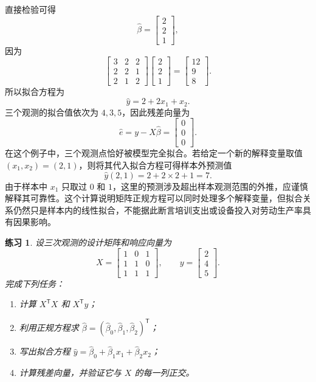 \documentclass[UTF8,fontset=fandol,11pt]{ctexart}
\newtheorem{exercise}[definition]{练习}
\begin{document}
直接检验可得
\[
\hat\beta=
\begin{bmatrix}2\\2\\1\end{bmatrix},
\]
因为
\[
\begin{bmatrix}3&2&2\\2&2&1\\2&1&2\end{bmatrix}
\begin{bmatrix}2\\2\\1\end{bmatrix}
=
\begin{bmatrix}12\\9\\8\end{bmatrix}.
\]
所以拟合方程为
\[
\hat y=2+2x_1+x_2.
\]
三个观测的拟合值依次为 $4,3,5$，因此残差向量为
\[
\hat e=y-X\hat\beta=
\begin{bmatrix}0\\0\\0\end{bmatrix}.
\]
在这个例子中，三个观测点恰好被模型完全拟合。若给定一个新的解释变量取值 $(x_1,x_2)=(2,1)$，则将其代入拟合方程可得样本外预测值
\[
\widehat y(2,1)=2+2\times 2+1=7.
\]
由于样本中 $x_1$ 只取过 $0$ 和 $1$，这里的预测涉及超出样本观测范围的外推，应谨慎解释其可靠性。这个计算说明矩阵正规方程可以同时处理多个解释变量，但拟合关系仍然只是样本内的线性拟合，不能据此断言培训支出或设备投入对劳动生产率具有因果影响。\par
\begin{exercise}
\label{mathagent:exercise:49ae28350c6a4abd6936597716c61d2e3cb07c4268424bce9420505d640e7b34}
设三次观测的设计矩阵和响应向量为
\[
X=\begin{bmatrix}1&0&1\\1&1&0\\1&1&1\end{bmatrix},
\qquad
 y=\begin{bmatrix}2\\4\\5\end{bmatrix}.
\]
完成下列任务：
\begin{enumerate}
\item 计算 $X^{\mathsf T}X$ 和 $X^{\mathsf T}y$；
\item 利用正规方程求 $\hat\beta=(\hat\beta_0,\hat\beta_1,\hat\beta_2)^{\mathsf T}$；
\item 写出拟合方程 $\hat y=\hat\beta_0+\hat\beta_1x_1+\hat\beta_2x_2$；
\item 计算残差向量，并验证它与 $X$ 的每一列正交。\end{enumerate}
\end{exercise}
\end{document}
